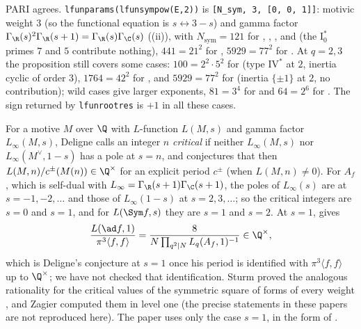 PARI agrees. \texttt{lfunparams(lfunsympow(E,2))} is \texttt{[N\_sym, 3, [0, 0, 1]]}: motivic weight $3$ (so the functional equation is $s\leftrightarrow3-s$) and gamma
factor $\Gamma_\R(s)^2\Gamma_\R(s+1)=\Gamma_\R(s)\Gamma_\C(s)$ ((ii)), with $N_{\mathrm{sym}}=121$ for , , ,
 and  (the $\mathrm I_0^*$ primes $7$ and $5$ contribute nothing), $441=21^2$ for , $5929=77^2$ for . At $q=2,3$ the
proposition still covers some cases: $100=2^2\cdot5^2$ for  (type $\mathrm{IV}^*$ at $2$, inertia cyclic of order $3$), $1764=42^2$ for , and $5929=77^2$ for
 (inertia $\{\pm1\}$ at $2$, no contribution); wild cases give larger exponents, $81=3^4$ for  and $64=2^6$ for . The sign returned
by \texttt{lfunrootres} is $+1$ in all these cases.

\begin{remark}\label{rem:lfunctions:critical}
For a motive $M$ over $\Q$ with $L$-function $L(M,s)$ and gamma factor $L_\infty(M,s)$, Deligne calls an integer $n$ \emph{critical} if neither $L_\infty(M,s)$ nor $L_\infty(M^\vee,1-s)$
has a pole at $s=n$, and conjectures that then $L(M,n)/c^\pm(M(n))\in\Q^\times$ for an explicit period $c^\pm$ \cite{Deligne79} (when $L(M,n)\ne0$). For $A_f$, which is self-dual
with $L_\infty=\Gamma_\R(s+1)\Gamma_\C(s+1)$, the poles of $L_\infty(s)$ are at $s=-1,-2,\dots$ and those of $L_\infty(1-s)$ at $s=2,3,\dots$; so the critical integers are
$s=0$ and $s=1$, and for $L(\Sym f,s)$ they are $s=1$ and $s=2$. At $s=1$,  gives
\[
\frac{L(\ad f,1)}{\pi^3\langle f,f\rangle}=\frac8{N\prod_{q^2\mid N}L_q(A_f,1)^{-1}}\in\Q^\times,
\]
which is Deligne's conjecture at $s=1$ once his period is identified with $\pi^3\langle f,f\rangle$ up to $\Q^\times$; we have not checked that identification. Sturm proved
the analogous rationality for the critical values of the symmetric square of forms of every weight \cite{Sturm80}, and Zagier computed them in level one
\cite{Zagier85} (the precise statements in these papers are not reproduced here). The paper uses only the case $s=1$, in the form of
.
\end{remark}

